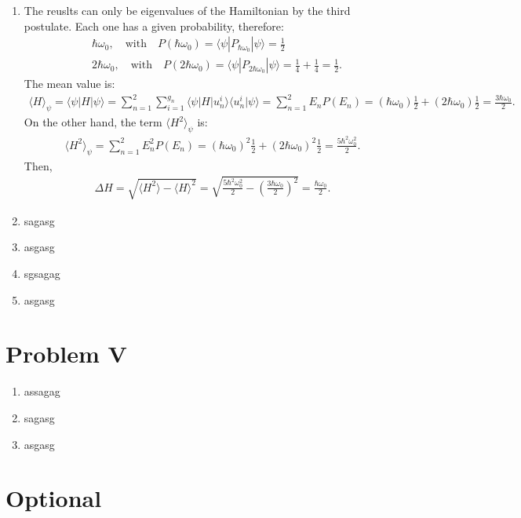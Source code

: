 \documentclass[letterpaper,11pt,twoside]{article}
\newcommand{\braket}[1]{\langle#1\rangle}
\begin{document}
\begin{enumerate}[itemsep=0pt,topsep=0pt,label=\alph*.]
  \item The reuslts can only be eigenvalues of the Hamiltonian by the third postulate. Each one has a given probability, therefore:
  \begin{align*}
    &\hbar\omega_0,\quad\text{with}\quad P(\hbar\omega_0)=\braket{\psi|P_{\hbar\omega_0}|\psi}=\frac{1}{2}\\
    &2\hbar\omega_0,\quad\text{with}\quad P(2\hbar\omega_0)=\braket{\psi|P_{2\hbar\omega_0}|\psi}=\frac{1}{4}+\frac{1}{4}=\frac{1}{2}.
  \end{align*}
  The mean value is:
  \begin{align*}
    \braket{H}_\psi=\braket{\psi|H|\psi}=\sum_{n=1}^2\sum_{i=1}^{g_n}\braket{\psi|H|u_n^i}\braket{u_n^i|\psi}=\sum_{n=1}^2E_nP(E_n)=(\hbar\omega_0)\frac{1}{2}+(2\hbar\omega_0)\frac{1}{2}=\frac{3\hbar\omega_0}{2}.
  \end{align*}
  On the other hand, the term $\braket{H^2}_\psi$ is:
  \begin{align*}
    \braket{H^2}_\psi=\sum_{n=1}^2E_n^2P(E_n)=(\hbar\omega_0)^2\frac{1}{2}+(2\hbar\omega_0)^2\frac{1}{2}=\frac{5\hbar^2\omega_0^2}{2}.
  \end{align*}
  Then,
  \begin{align*}
    \Delta H=\sqrt{\braket{H^2}-\braket{H}^2}=\sqrt{\frac{5\hbar^2\omega_0^2}{2}-\left(\frac{3\hbar\omega_0}{2}\right)^2}=\frac{\hbar\omega_0}{2}.
  \end{align*}
  \item sagasg
  \item asgasg
  \item sgsagag
  \item asgasg
\end{enumerate}
\section*{Problem V}
\begin{enumerate}[itemsep=0pt,topsep=0pt,label=\alph*.]
  \item assagag
  \item sagasg
  \item asgasg
\end{enumerate}



\section*{Optional}
\end{document}
